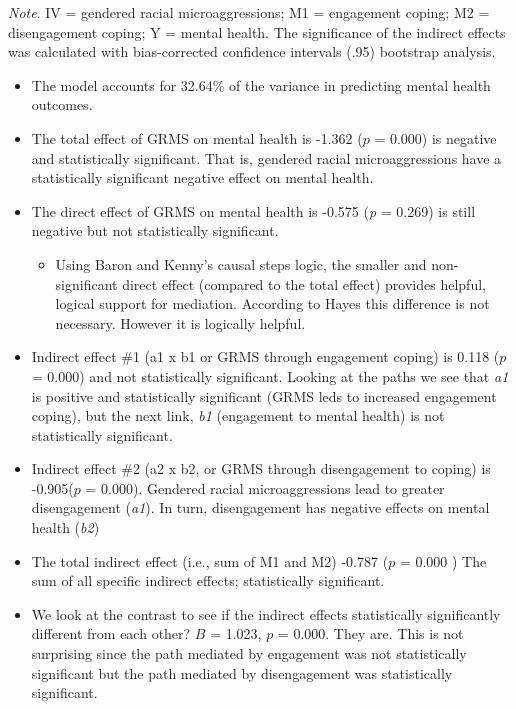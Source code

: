 \documentclass[
  11pt,
]{book}
\providecommand{\tightlist}{%
  \setlength{\itemsep}{0pt}\setlength{\parskip}{0pt}}
\begin{document}
\begin{longtable}[]{@{}
  >{\raggedright\arraybackslash}p{}@{}}
\toprule
\endhead
\bottomrule
\end{longtable}

\emph{Note}. IV = gendered racial microaggressions; M1 = engagement coping; M2 = disengagement coping; Y = mental health. The significance of the indirect effects was calculated with bias-corrected confidence intervals (.95) bootstrap analysis.

\begin{itemize}
\tightlist
\item
  The model accounts for 32.64\% of the variance in predicting mental health outcomes.
\item
  The total effect of GRMS on mental health is -1.362 (\(p\) = 0.000) is negative and statistically significant. That is, gendered racial microaggressions have a statistically significant negative effect on mental health.
\item
  The direct effect of GRMS on mental health is -0.575 (\emph{p} = 0.269) is still negative but not statistically significant.

  \begin{itemize}
  \tightlist
  \item
    Using Baron and Kenny's \citeyearpar{baron_moderator-mediator_1986} causal steps logic, the smaller and non-significant direct effect (compared to the total effect) provides helpful, logical support for mediation. According to Hayes \citeyearpar{hayes_introduction_2018} this difference is not necessary. However it is logically helpful.
  \end{itemize}
\item
  Indirect effect \#1 (a1 x b1 or GRMS through engagement coping) is 0.118 (\(p\) = 0.000) and not statistically significant. Looking at the paths we see that \emph{a1} is positive and statistically significant (GRMS leds to increased engagement coping), but the next link, \emph{b1} (engagement to mental health) is not statistically significant.
\item
  Indirect effect \#2 (a2 x b2, or GRMS through disengagement to coping) is -0.905(\(p\) = 0.000). Gendered racial microaggressions lead to greater disengagement (\emph{a1}). In turn, disengagement has negative effects on mental health (\emph{b2})
\item
  The total indirect effect (i.e., sum of M1 and M2) -0.787 (\(p\) = 0.000 ) The sum of all specific indirect effects; statistically significant.
\item
  We look at the contrast to see if the indirect effects statistically significantly different from each other? \(B\) = 1.023, \(p\) = 0.000. They are. This is not surprising since the path mediated by engagement was not statistically significant but the path mediated by disengagement was statistically significant.
\end{itemize}
\end{document}

